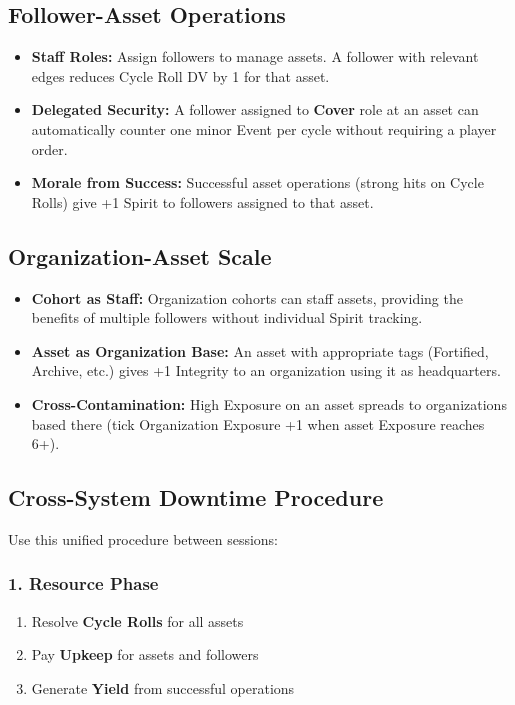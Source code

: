 \documentclass[10pt]{article}
\begin{document}
    \subsection{Follower-Asset Operations}
    \begin{itemize}
    \item \textbf{Staff Roles:} Assign followers to manage assets. A follower with relevant edges reduces Cycle Roll DV by 1 for that asset.
    \item \textbf{Delegated Security:} A follower assigned to \textbf{Cover} role at an asset can automatically counter one minor Event per cycle without requiring a player order.
    \item \textbf{Morale from Success:} Successful asset operations (strong hits on Cycle Rolls) give +1 Spirit to followers assigned to that asset.
    \end{itemize}
    
    \subsection{Organization-Asset Scale}
    \begin{itemize}
    \item \textbf{Cohort as Staff:} Organization cohorts can staff assets, providing the benefits of multiple followers without individual Spirit tracking.
    \item \textbf{Asset as Organization Base:} An asset with appropriate tags (Fortified, Archive, etc.) gives +1 Integrity to an organization using it as headquarters.
    \item \textbf{Cross-Contamination:} High Exposure on an asset spreads to organizations based there (tick Organization Exposure +1 when asset Exposure reaches 6+).
    \end{itemize}
    
    \subsection{Cross-System Downtime Procedure}
    Use this unified procedure between sessions:
    
    \subsubsection{1. Resource Phase}
    \begin{enumerate}
    \item Resolve \textbf{Cycle Rolls} for all assets
    \item Pay \textbf{Upkeep} for assets and followers
    \item Generate \textbf{Yield} from successful operations
    \end{enumerate}
    
\end{document}
